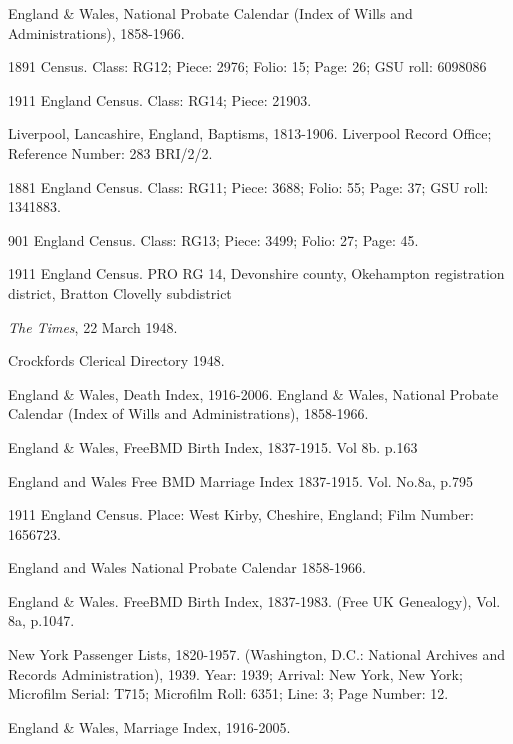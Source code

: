 \begin{thebibliography}{99}
	England \& Wales, National Probate Calendar (Index of Wills and Administrations), 1858-1966. 

	1891 Census. Class: RG12; Piece: 2976; Folio: 15; Page: 26; GSU roll: 6098086

	1911 England Census. Class: RG14; Piece: 21903.

	Liverpool, Lancashire, England, Baptisms, 1813-1906.
	Liverpool Record Office; Reference Number: 283 BRI/2/2.
	
	1881 England Census. Class: RG11; Piece: 3688; Folio: 55; Page: 37; GSU roll: 1341883.
	
	901 England Census. Class: RG13; Piece: 3499; Folio: 27; Page: 45.
	
	1911 England Census. PRO RG 14, Devonshire county, Okehampton registration district, 
	Bratton Clovelly subdistrict
	
	\emph{The Times}, 22 March 1948.

	 Crockfords Clerical Directory 1948. 
	 
	 England \& Wales, Death Index, 1916-2006.
	 England \& Wales, National Probate Calendar (Index of Wills and Administrations), 1858-1966. 
	 
	England \& Wales, FreeBMD Birth Index, 1837-1915. Vol 8b. p.163
	
	England and Wales Free BMD Marriage Index 1837-1915. Vol. No.8a, p.795
	
	1911 England Census. Place: West Kirby, Cheshire, England; Film Number: 1656723.

	England and Wales National Probate Calendar 1858-1966.
	
	England \& Wales. FreeBMD Birth Index, 1837-1983. (Free UK Genealogy), Vol. 8a, p.1047. 
	
	New York Passenger Lists, 1820-1957. (Washington, D.C.: National Archives and Records Administration), 1939.
	Year: 1939; Arrival: New York, New York; Microfilm Serial: T715; Microfilm Roll: 6351; Line: 3; Page Number: 12.

	England \& Wales, Marriage Index, 1916-2005. 
	

\end{thebibliography}
